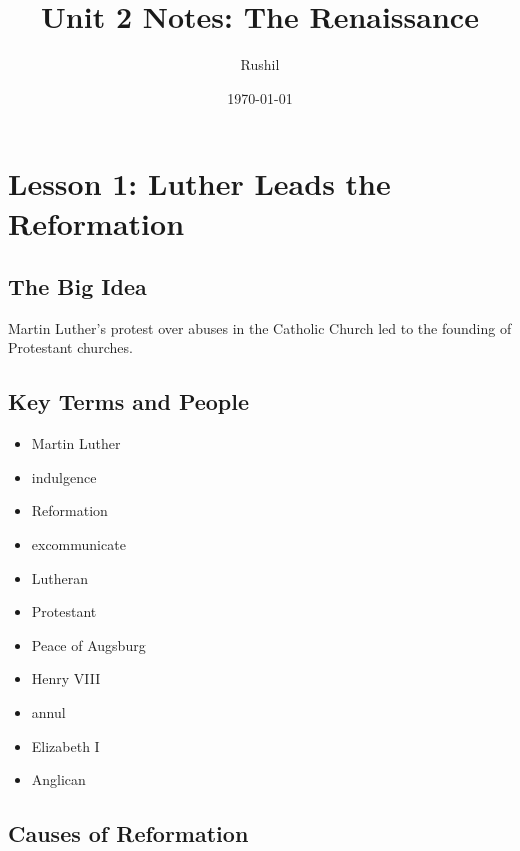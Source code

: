 \documentclass[11pt]{article}
\author{Rushil}
\date{\today}
\title{Unit 2 Notes: The Renaissance}
\begin{document}
\maketitle
\newpage
\section{Lesson 1: Luther Leads the Reformation}
\label{sec:org749773a}
\subsection{The Big Idea}
\label{sec:org9044da0}
Martin Luther's protest over abuses in the Catholic Church led to the founding of Protestant churches.
\subsection{Key Terms and People}
\label{sec:orgb7dffed}
\begin{itemize}
\item Martin Luther
\item indulgence
\item Reformation
\item excommunicate
\item Lutheran
\item Protestant
\item Peace of Augsburg
\item Henry VIII
\item annul
\item Elizabeth I
\item Anglican
\end{itemize}
\subsection{Causes of Reformation}
\label{sec:orge4bcaf8}
\end{document}
